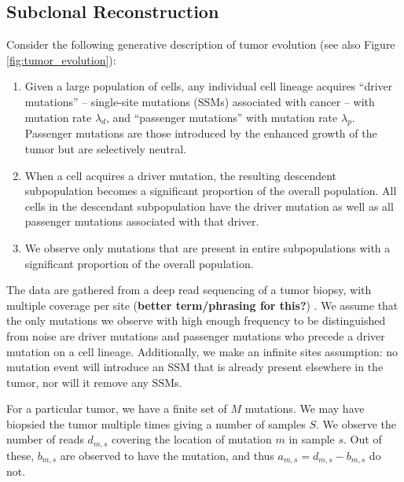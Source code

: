\documentclass{bioinfo}
\begin{document}
\begin{methods}

\section{Subclonal Reconstruction}
\label{sec:likelihood}
Consider the following generative description of tumor evolution (see also Figure \ref{fig:tumor_evolution}):
\begin{enumerate}
\item Given a large population of cells, any individual cell lineage acquires ``driver mutations'' -- single-site mutations (SSMs) associated with cancer -- with mutation rate $\lambda_d$, and ``passenger mutations'' with mutation rate $\lambda_p$. Passenger mutations are those introduced by the enhanced growth of the tumor but are selectively neutral.
\item When a cell acquires a driver mutation, the resulting descendent subpopulation becomes a significant proportion of the overall population.  All cells in the descendant subpopulation have the driver mutation as well as all passenger mutations associated with that driver.
\item We observe only mutations that are present in entire subpopulations with a significant proportion of the overall population. 
\end{enumerate}
The data are gathered from a deep read sequencing of a tumor biopsy, with multiple coverage per site ({\bf better term/phrasing for this?}) .  We assume that the only mutations we observe with high enough frequency to be distinguished from noise are driver mutations and passenger mutations who precede a driver mutation on a cell lineage.  Additionally, we make an infinite sites assumption: no mutation event will introduce an SSM that is already present elsewhere in the tumor, nor will it remove any SSMs.  

For a particular tumor, we have a finite set of $M$ mutations.  We may have biopsied the tumor multiple times giving a number of samples $S$.  We observe the number of reads $d_{m,s}$ covering the location of mutation $m$ in sample $s$.  Out of these, $b_{m,s}$ are observed to have the mutation, and thus $a_{m,s} = d_{m,s}-b_{m,s}$ do not.



\end{methods}
\end{document}
